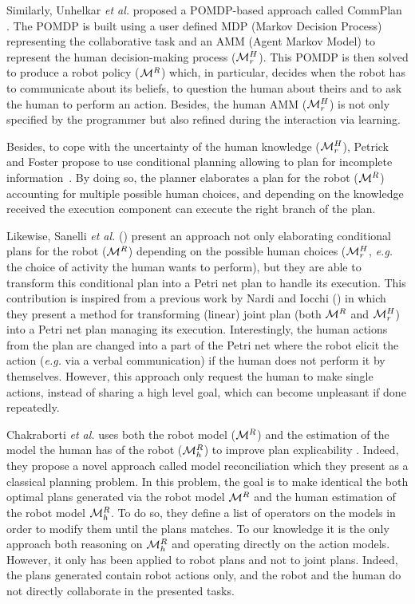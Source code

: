 \documentclass[a4paper,11pt,twoside]{StyleThese}
\begin{document}
Similarly, Unhelkar \textit{et al.} proposed a POMDP-based approach called CommPlan \cite{unhelkar2020decision}. The POMDP is built using a user defined MDP (Markov Decision Process) representing the collaborative task and an AMM (Agent Markov Model) to represent the human decision-making process ($\mathcal{M}^H_r$). This POMDP is then solved to produce a robot policy ($\mathcal{M}^R$) which, in particular, decides when the robot has to communicate about its beliefs, to question the human about theirs and to ask the human to perform an action. Besides, the human AMM ($\mathcal{M}^H_r$) is not only specified by the programmer but also refined during the interaction via learning.

Besides, to cope with the uncertainty of the human knowledge ($\mathcal{M}^H_r$), Petrick and Foster propose to use conditional planning allowing to plan for incomplete information~\cite{petrick2013planning}. By doing so, the planner elaborates a plan for the robot ($\mathcal{M}^R$) accounting for multiple possible human choices, and depending on the knowledge received the execution component can execute the right branch of the plan.

Likewise, Sanelli \textit{et al.} (\cite{sanelli2017short}) present an approach not only elaborating conditional plans for the robot ($\mathcal{M}^R$)  depending on the possible human choices ($\mathcal{M}^H_r$, \textit{e.g.} the choice of activity the human wants to perform), but they are able to transform this conditional plan into a Petri net plan to handle its execution. This contribution is inspired from a previous work by Nardi and Iocchi (\cite{nardi2014representation}) in which they present a method for transforming (linear) joint plan (both $\mathcal{M}^R$ and $\mathcal{M}^H_r$) into a Petri net plan managing its execution. Interestingly, the human actions from the plan are changed into a part of the Petri net where the robot elicit the action (\textit{e.g.} via a verbal communication) if the human does not perform it by themselves. However, this approach only request the human to make single actions, instead of sharing a high level goal, which can become unpleasant if done repeatedly. 

Chakraborti \textit{et al.} uses both the robot model ($\mathcal{M}^R$) and the estimation of the model the human has of the robot ($\mathcal{M}^R_h$) to improve plan explicability \cite{chakraborti2017plan}. Indeed, they propose a novel approach called model reconciliation which they present as a classical planning problem. In this problem, the goal is to make identical the both optimal plans generated via the robot model $\mathcal{M}^R$ and the human estimation of the robot model $\mathcal{M}^R_h$. To do so, they define a list of operators on the models in order to modify them until the plans matches. To our knowledge it is the only approach both reasoning on $\mathcal{M}^R_h$ and operating directly on the action models. However, it only has been applied to robot plans and not to joint plans. Indeed, the plans generated contain robot actions only, and the robot and the human do not directly collaborate in the presented tasks.
\end{document}

